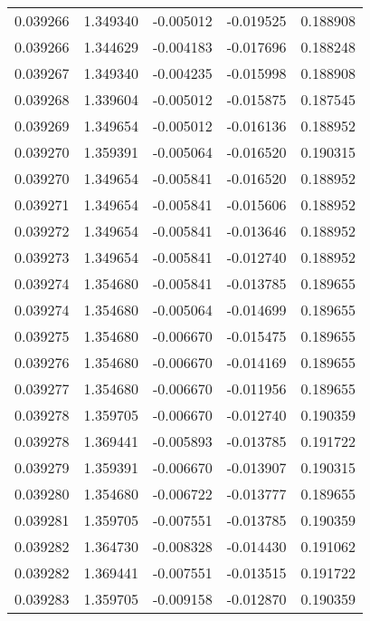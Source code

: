 \begin{tabular}{lrrrr}
0.039266    &  1.349340 & -0.005012 & -0.019525 &             0.188908 \\
0.039266    &  1.344629 & -0.004183 & -0.017696 &             0.188248 \\
0.039267    &  1.349340 & -0.004235 & -0.015998 &             0.188908 \\
0.039268    &  1.339604 & -0.005012 & -0.015875 &             0.187545 \\
0.039269    &  1.349654 & -0.005012 & -0.016136 &             0.188952 \\
0.039270    &  1.359391 & -0.005064 & -0.016520 &             0.190315 \\
0.039270    &  1.349654 & -0.005841 & -0.016520 &             0.188952 \\
0.039271    &  1.349654 & -0.005841 & -0.015606 &             0.188952 \\
0.039272    &  1.349654 & -0.005841 & -0.013646 &             0.188952 \\
0.039273    &  1.349654 & -0.005841 & -0.012740 &             0.188952 \\
0.039274    &  1.354680 & -0.005841 & -0.013785 &             0.189655 \\
0.039274    &  1.354680 & -0.005064 & -0.014699 &             0.189655 \\
0.039275    &  1.354680 & -0.006670 & -0.015475 &             0.189655 \\
0.039276    &  1.354680 & -0.006670 & -0.014169 &             0.189655 \\
0.039277    &  1.354680 & -0.006670 & -0.011956 &             0.189655 \\
0.039278    &  1.359705 & -0.006670 & -0.012740 &             0.190359 \\
0.039278    &  1.369441 & -0.005893 & -0.013785 &             0.191722 \\
0.039279    &  1.359391 & -0.006670 & -0.013907 &             0.190315 \\
0.039280    &  1.354680 & -0.006722 & -0.013777 &             0.189655 \\
0.039281    &  1.359705 & -0.007551 & -0.013785 &             0.190359 \\
0.039282    &  1.364730 & -0.008328 & -0.014430 &             0.191062 \\
0.039282    &  1.369441 & -0.007551 & -0.013515 &             0.191722 \\
0.039283    &  1.359705 & -0.009158 & -0.012870 &             0.190359 \\

\end{tabular}
